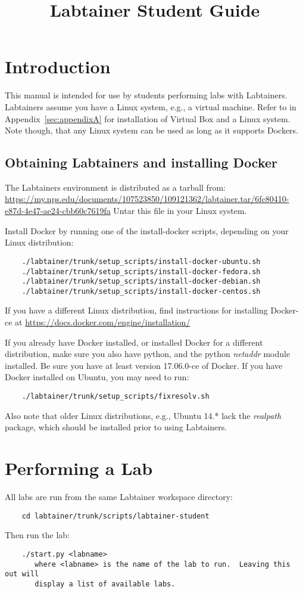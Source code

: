 \documentclass[12pt]{article}
\begin{document}
\title {Labtainer Student Guide}
\maketitle

\section {Introduction}
This manual is intended for use by students performing labs with Labtainers.
Labtainers assume you have a Linux system, e.g., a virtual machine.  Refer to
in Appendix~\ref{sec:appendixA} for installation of Virtual Box and a Linux system.
Note though, that any Linux system can be used as long as it supports Dockers.

\subsection{Obtaining Labtainers and installing Docker}
The Labtainers environment is distributed as a tarball from:
\url{https://my.nps.edu/documents/107523850/109121362/labtainer.tar/6fc80410-e87d-4e47-ae24-cbb60c7619fa}
Untar this file in your Linux system.

Install Docker by running one of the install-docker scripts, depending on your Linux
distribution:
\begin{verbatim}
    ./labtainer/trunk/setup_scripts/install-docker-ubuntu.sh
    ./labtainer/trunk/setup_scripts/install-docker-fedora.sh
    ./labtainer/trunk/setup_scripts/install-docker-debian.sh
    ./labtainer/trunk/setup_scripts/install-docker-centos.sh
\end{verbatim}
If you have a different Linux distribution, find instructions for installing Docker-ce at
\url{https://docs.docker.com/engine/installation/}

If you already have Docker installed, or installed Docker for a different distribution,
make sure you also have python, and
the python \textit{netaddr} module installed.  Be sure you have at least version 17.06.0-ce of Docker.
If you have Docker installed on Ubuntu, you
may need to run:
\begin{verbatim}
    ./labtainer/trunk/setup_scripts/fixresolv.sh
\end{verbatim}
\noindent Also note that older Linux distributions, e.g., Ubuntu 14.* lack the
\textit{realpath} package, which should be installed prior to using Labtainers.

\section{Performing a Lab}
All labs are run from the same Labtainer workspace directory:
\begin{verbatim}
    cd labtainer/trunk/scripts/labtainer-student
\end{verbatim}
\noindent Then run the lab:
\begin{verbatim}
    ./start.py <labname>
       where <labname> is the name of the lab to run.  Leaving this out will 
       display a list of available labs.
\end{verbatim}
\end{document}
